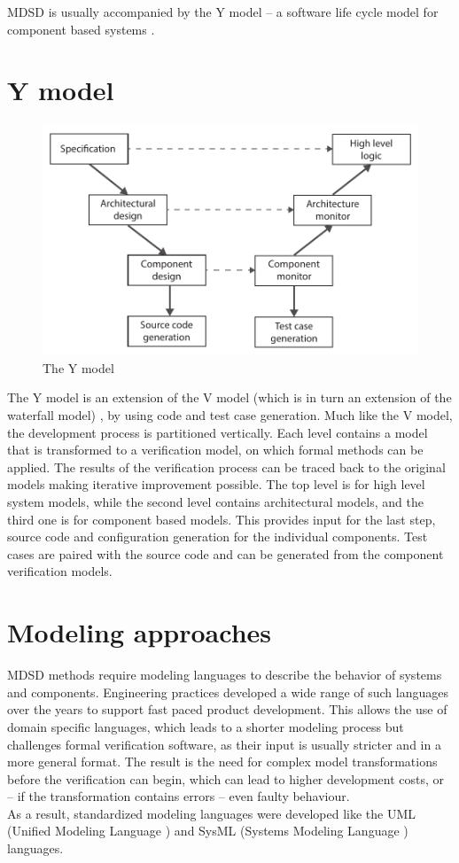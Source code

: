 MDSD is usually accompanied by the Y model -- a software life cycle model for component based systems \citep{ymodel}.

\section{Y model} %

\begin{figure}[h]
	\centering
	\includegraphics[width=0.8\linewidth]{include/figures/chapter_1/YModel}
	\caption{The Y model}
	\label{fig:intro:vmodel}
\end{figure}

The Y model \citep{ymodel} is an extension of the V model (which is in turn an extension of the waterfall model) \citep{randomwikipedialink3}, by using code and test case generation. Much like the V model, the development process is partitioned vertically. Each level contains a model that is transformed to a verification model, on which formal methods can be applied. The results of the verification process can be traced back to the original models making iterative improvement possible. The top level is for high level system models, while the second level contains architectural models, and the third one is for component based models. This provides input for the last step, source code and configuration generation for the individual components. Test cases are paired with the source code and can be generated from the component verification models.

\section{Modeling approaches}

MDSD methods require modeling languages to describe the behavior of systems and components. Engineering practices developed a wide range of such languages over the years to support fast paced product development. This allows the use of domain specific languages, which leads to a shorter modeling process but challenges formal verification software, as their input is usually stricter and in a more general format. The result is the need for complex model transformations before the verification can begin, which can lead to higher development costs, or -- if the transformation contains errors -- even faulty behaviour.\\
As a result, standardized modeling languages were developed like the UML (Unified Modeling Language \citep{uml}) and SysML (Systems Modeling Language \citep{sysml}) languages.

